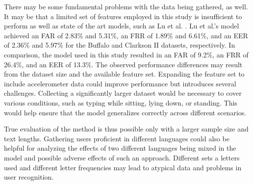 There may be some fundamental problems with the data being gathered, as well. It may be that a limited set of features employed in this study is insufficient to perform as well as state of the art models, such as Lu et al. \cite{Lu2020}. Lu et al.'s model achieved an FAR of 2.83\% and 5.31\%, an FRR of 1.89\% and 6.61\%, and an EER of 2.36\% and 5.97\% for the Buffalo and Clarkson II datasets, respectively. In comparison, the model used in this study resulted in an FAR of 9.2\%, an FRR of 26.4\%, and an EER of 13.3\%. The observed performance differences may result from the dataset size and the available feature set. Expanding the feature set to include accelerometer data could improve performance but introduces several challenges. Collecting a significantly larger dataset would be necessary to cover various conditions, such as typing while sitting, lying down, or standing. This would help ensure that the model generalizes correctly across different scenarios.

True evaluation of the method is thus possible only with a larger sample size and text lengths. Gathering users proficient in different languages could also be helpful for analyzing the effects of two different languages being mixed in the model and possible adverse effects of such an approach. Different sets a letters used and different letter frequencies may lead to atypical data and problems in user recognition.